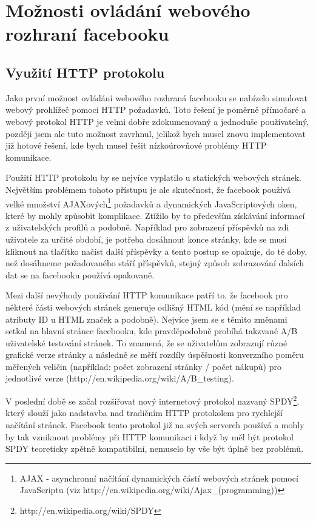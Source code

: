 \documentclass[thesis=M,czech]{FITthesis}[2013/05/10]
\begin{document}
\section{Možnosti ovládání webového rozhraní facebooku}

\subsection{Využití HTTP protokolu}

Jako první možnost ovládání webového rozhraná facebooku se nabízelo simulovat webový prohlížeč pomocí HTTP požadavků. Toto řešení je poměrně přímočaré a webový protokol HTTP je velmi dobře zdokumenovaný a jednoduše používatelný, později jsem ale tuto možnost zavrhnul, jelikož bych musel znovu implementovat již hotové řešení, kde bych musel řešit nízkoúrovňové problémy HTTP komunikace. 

Použití HTTP protokolu by se nejvíce vyplatilo u statických webových stránek. Největším problémem tohoto přístupu je ale skutečnost, že facebook používá velké množství AJAXových\footnote{AJAX - asynchronní načítání dynamických částí webových stránek pomocí JavaScriptu (viz http://en.wikipedia.org/wiki/Ajax\_(programming))} požadavků a dynamických JavaScriptových oken, které by mohly způsobit komplikace. Ztížilo by to především získávání informací z uživatelských profilů a podobně. Například pro zobrazení příspěvků na zdi uživatele za určité období, je potřeba dosáhnout konce stránky, kde se musí kliknout na tlačítko načíst další příspěvky a tento postup se opakuje, do té doby, než dosáhneme požadovaného stáří příspěvků, stejný způsob zobrazování dalsích dat se na facebooku používá opakovaně.

Mezi další nevýhody používání HTTP komunikace patří to, že facebook pro některé části webových stránek generuje odlišný HTML kód (mění se například atributy ID u HTML značek a podobně). Nejvíce jsem se s těmito změnami setkal na hlavní stránce facebooku, kde pravděpodobně probíhá takzvané A/B uživatelské testování stránek. To znamená, že se uživatelům zobrazují různé grafické verze stránky a následně se měří rozdíly úspěšnosti konverzního poměru měřených veličin (například: počet zobrazení stránky / počet nákupů) pro jednotlivé verze
\newline(http://en.wikipedia.org/wiki/A/B\_testing).

V poslední době se začal rozšiřovat nový internetový protokol nazvaný SPDY\footnote{http://en.wikipedia.org/wiki/SPDY}, který slouží jako nadstavba nad tradičním HTTP protokolem pro rychlejší načítání stránek. Facebook tento protokol již na svých serverch používá a mohly by tak vzniknout problémy při HTTP komunikaci i když by měl být protokol SPDY teoreticky zpětně kompatibilní, nemuselo by vše být úplně bez problémů.
\end{document}
